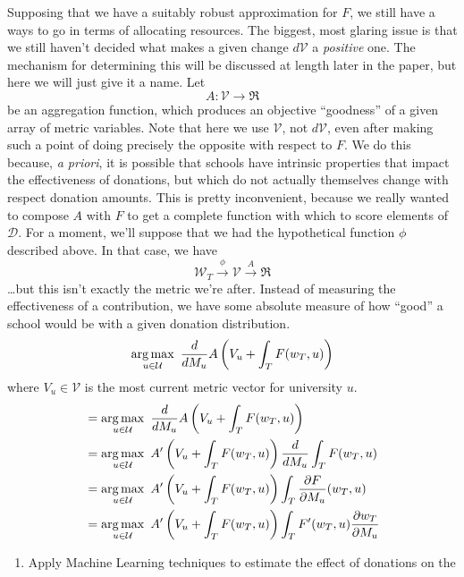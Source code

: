 \documentclass[paper.tex]{subfiles}
\newcommand{\UU}{\mathcal{U}}
\newcommand{\D}{\mathcal{D}}
\newcommand{\V}{\mathcal{V}}
\newcommand{\W}{\mathcal{W}}
\begin{document}
	Supposing that we have a suitably robust approximation for $F$, we still have a ways to go in terms of allocating resources. The biggest, most glaring issue is that we still haven't decided what makes a given change $d\V$ a \emph{positive} one. The mechanism for determining this will be discussed at length later in the paper, but here we will just give it a name. Let
	\begin{equation}
		A : \V \to \Re
	\end{equation}
	be an aggregation function, which produces an objective ``goodness'' of a given array of metric variables. Note that here we use $\V$, not $d\V$, even after making such a point of doing precisely the opposite with respect to $F$. We do this because, \emph{a priori}, it is possible that schools have intrinsic properties that impact the effectiveness of donations, but which do not actually themselves change with respect donation amounts. This is pretty inconvenient, because we really wanted to compose $A$ with $F$ to get a complete function with which to score elements of $\D$. For a moment, we'll suppose that we had the hypothetical function $\phi$ described above. In that case, we have
	\[ \W_T \overset{\phi}{\to} \V \overset{A}{\to} \Re \] 
	\ldots but this isn't exactly the metric we're after. Instead of measuring the effectiveness of a contribution, we have some absolute measure of how ``good'' a school would be with a given donation distribution.
	\begin{equation}
		\argmax_{u \in \UU}~ \frac{d}{dM_u} A\left(V_u + \int_{T} F(w_T, u)\right)
	\end{equation}
	where $V_u \in \V$ is the most current metric vector for university $u$.  
	\begin{align*}
		&=\argmax_{u \in \UU}~ \frac{d}{dM_u} A\left(V_u + \int_{T} F(w_T, u)\right) \\
		&=\argmax_{u \in \UU}~  A'\left(V_u + \int_{T} F(w_T, u)\right)\frac{d}{dM_u}\int_{T} F(w_T, u) \\
		&=\argmax_{u \in \UU}~  A'\left(V_u + \int_{T} F(w_T, u)\right)\int_{T} \frac{\partial F}{\partial M_u}(w_T, u) \\
		&=\argmax_{u \in \UU}~  A'\left(V_u + \int_{T} F(w_T, u)\right)\int_{T} F'(w_T, u) \frac{\partial w_T}{\partial M_u} \\
	\end{align*}
	\begin{enumerate}
		\item Apply Machine Learning techniques to estimate the effect of donations on the 
	\end{enumerate}
\end{document}
